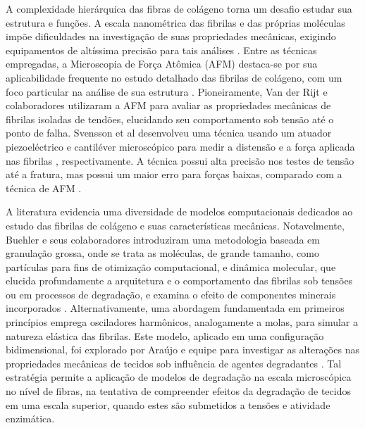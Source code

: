 \documentclass[11pt,a4paper]{article} %
\begin{document}
A complexidade hierárquica das fibras de colágeno torna um desafio estudar sua estrutura e funções. A escala nanométrica das 
fibrilas e das próprias moléculas impõe dificuldades na investigação de suas propriedades mecânicas, exigindo equipamentos de  
altíssima precisão para tais análises \cite{Nalbach2022InstrumentFT}. Entre as técnicas empregadas, a Microscopia de Força Atômica  
(AFM) destaca-se por sua aplicabilidade frequente no estudo detalhado das fibrilas de colágeno, com um foco particular na análise de  
sua estrutura \cite{Andriotis2015-lx,Mull2022-br}. Pioneiramente, Van der Rijt e colaboradores \cite{Rijt} utilizaram a AFM para  
avaliar as propriedades mecânicas de fibrilas isoladas de tendões, elucidando seu comportamento sob tensão até o ponto de falha.  
Svensson et al desenvolveu uma técnica usando um atuador piezoeléctrico e cantiléver microscópico para medir a distensão e a força  
aplicada nas fibrilas \cite{SVENSSON2018270}, respectivamente. A técnica possui alta precisão nos testes de tensão até a fratura, 
mas possui um maior erro para forças baixas, comparado com a técnica de AFM \cite{ANDRIOTIS202335}. 


A literatura evidencia uma diversidade de modelos computacionais dedicados ao estudo das fibrilas de colágeno e suas características  
mecânicas. Notavelmente, Buehler e seus colaboradores \cite{B1,B2,B3} introduziram uma metodologia baseada em granulação grossa, onde se 
trata as moléculas, de grande tamanho, como partículas para fins de otimização computacional, e dinâmica molecular, que elucida profundamente a arquitetura  
e o comportamento das fibrilas sob tensões ou em processos de degradação, e examina o efeito de componentes minerais incorporados  
\cite{B4,Malaspina2017-qp,10.1002/jbmr.2705}. Alternativamente, uma abordagem fundamentada em primeiros princípios emprega osciladores  
harmônicos, analogamente a molas, para simular a natureza elástica das fibrilas. Este modelo, aplicado em uma configuração bidimensional, 
foi explorado por Araújo e equipe para investigar as alterações nas propriedades mecânicas de tecidos sob influência de agentes degradantes 
 \cite{Araujo}. Tal estratégia permite a aplicação de modelos de degradação na  escala microscópica no nível de fibras, na tentativa de  
compreender efeitos da degradação de tecidos em uma escala superior, quando estes são submetidos a tensões e atividade enzimática. 
\end{document}

